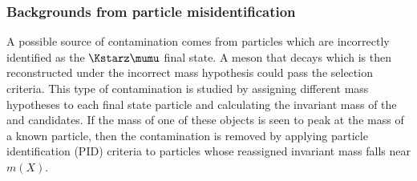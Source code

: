 \subsubsection{Backgrounds from particle misidentification}
\label{sec:backgrounds:misid}

A possible source of contamination comes from particles which are incorrectly identified as the
$\Kstarz\mumu$ final state.  A meson that decays  which is then reconstructed under the incorrect mass
hypothesis could pass the selection criteria.
This type of contamination is studied by assigning different mass hypotheses to each final state
particle and calculating the invariant mass of the \mumu and \kpi candidates.
If the mass of one of these objects is seen to peak at the mass of a known particle, then the
contamination is removed  by applying particle identification (PID) criteria to particles whose reassigned invariant mass falls near $m(X)$.


